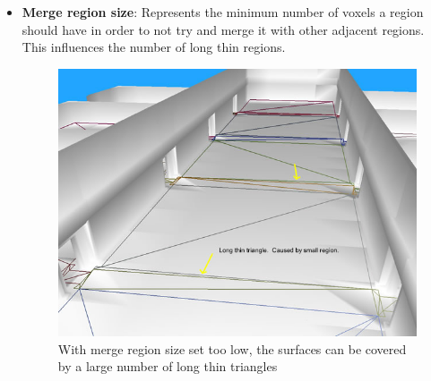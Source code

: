 \begin{itemize}
  
%  
  
  \item\textbf{Merge region size}: Represents the minimum number of voxels a region should have in order to not try and merge it with other adjacent regions. This influences the number of long thin regions.
  
  \begin{figure}[H]
	\centering
	\includegraphics[width=1\textwidth]{../images/merge_region_0.png}
	\caption{With merge region size set too low, the surfaces can be covered by a large number of long thin triangles}
\end{figure}
  

\end{itemize}
